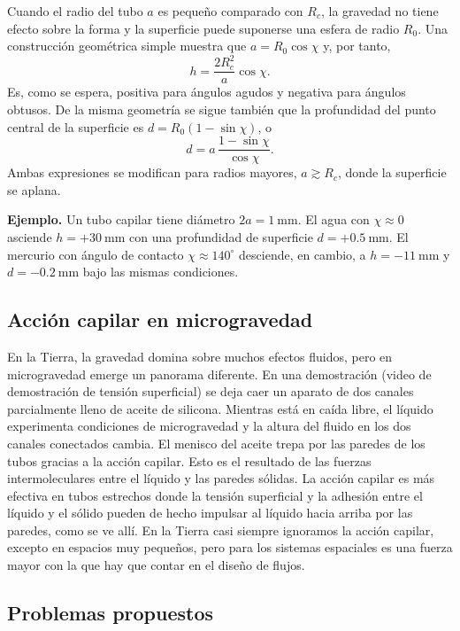 Cuando el radio del tubo $a$ es pequeño comparado con $R_c$, la gravedad no tiene efecto sobre la forma y la superficie puede suponerse una esfera de radio $R_0$. Una construcción geométrica simple muestra que $a = R_0\cos\chi$ y, por tanto,
$$ h = \frac{2R_c^2}{a}\cos\chi. $$
Es, como se espera, positiva para ángulos agudos y negativa para ángulos obtusos. De la misma geometría se sigue también que la profundidad del punto central de la superficie es $d = R_0(1 - \sin\chi)$, o
$$ d = a\,\frac{1 - \sin\chi}{\cos\chi}. $$
Ambas expresiones se modifican para radios mayores, $a \gtrsim R_c$, donde la superficie se aplana.

\textbf{Ejemplo.} Un tubo capilar tiene diámetro $2a = 1\ \mathrm{mm}$. El agua con $\chi \approx 0$ asciende $h = +30\ \mathrm{mm}$ con una profundidad de superficie $d = +0.5\ \mathrm{mm}$. El mercurio con ángulo de contacto $\chi \approx 140^\circ$ desciende, en cambio, a $h = -11\ \mathrm{mm}$ y $d = -0.2\ \mathrm{mm}$ bajo las mismas condiciones.

\subsection{Acción capilar en microgravedad}

En la Tierra, la gravedad domina sobre muchos efectos fluidos, pero en microgravedad emerge un panorama diferente. En una demostración (video de demostración de tensión superficial) se deja caer un aparato de dos canales parcialmente lleno de aceite de silicona. Mientras está en caída libre, el líquido experimenta condiciones de microgravedad y la altura del fluido en los dos canales conectados cambia. El menisco del aceite trepa por las paredes de los tubos gracias a la acción capilar. Esto es el resultado de las fuerzas intermoleculares entre el líquido y las paredes sólidas. La acción capilar es más efectiva en tubos estrechos donde la tensión superficial y la adhesión entre el líquido y el sólido pueden de hecho impulsar al líquido hacia arriba por las paredes, como se ve allí. En la Tierra casi siempre ignoramos la acción capilar, excepto en espacios muy pequeños, pero para los sistemas espaciales es una fuerza mayor con la que hay que contar en el diseño de flujos.

\subsection{Problemas propuestos}

